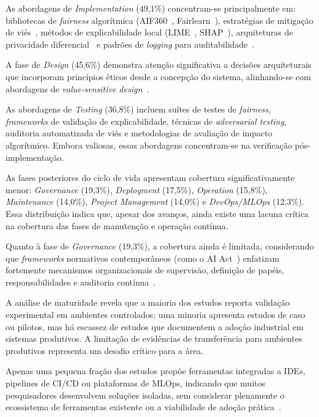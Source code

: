 As abordagens de \textit{Implementation} (49,1\%) concentram-se principalmente em: bibliotecas de \textit{fairness} algorítmica (AIF360~\cite{Bellamy2019}, Fairlearn~\cite{Bird2020}), estratégias de mitigação de viés~\cite{Kamiran2013, Zemel2013}, métodos de explicabilidade local (LIME~\cite{Ribeiro2016}, SHAP~\cite{Lundberg2017}), arquiteturas de privacidade diferencial~\cite{Abadi2016, McMahan2018} e padrões de \textit{logging} para auditabilidade~\cite{Mitchell2019, Arnold2019}. 

A fase de \textit{Design} (45,6\%) demonstra atenção significativa a decisões arquiteturais que incorporam princípios éticos desde a concepção do sistema, alinhando-se com abordagens de \textit{value-sensitive design}~\cite{Friedman2013, VanWynsberghe2013}.

As abordagens de \textit{Testing} (36,8\%) incluem suítes de testes de \textit{fairness}, \textit{frameworks} de validação de explicabilidade, técnicas de \textit{adversarial testing}, auditoria automatizada de viés e metodologias de avaliação de impacto algorítmico. Embora valiosas, essas abordagens concentram-se na verificação pós-implementação.

As fases posteriores do ciclo de vida apresentam cobertura significativamente menor: \textit{Governance} (19,3\%), \textit{Deployment} (17,5\%), \textit{Operation} (15,8\%), \textit{Maintenance} (14,0\%), \textit{Project Management} (14,0\%) e \textit{DevOps/MLOps} (12,3\%). Essa distribuição indica que, apesar dos avanços, ainda existe uma lacuna crítica na cobertura das fases de manutenção e operação contínua.

Quanto à fase de \textit{Governance} (19,3\%), a cobertura ainda é limitada, considerando que \textit{frameworks} normativos contemporâneos (como o AI Act~\cite{EUAIAct2024}) enfatizam fortemente mecanismos organizacionais de supervisão, definição de papéis, responsabilidades e auditoria contínua~\cite{Raji2020, Metcalf2021}.

A análise de maturidade revela que a maioria dos estudos reporta validação experimental em ambientes controlados; uma minoria apresenta estudos de caso ou pilotos, mas há escassez de estudos que documentem a adoção industrial em sistemas produtivos. A limitação de evidências de transferência para ambientes produtivos representa um desafio crítico para a área.

Apenas uma pequena fração dos estudos propõe ferramentas integradas a IDEs, pipelines de CI/CD ou plataformas de MLOps, indicando que muitos pesquisadores desenvolvem soluções isoladas, sem considerar plenamente o ecossistema de ferramentas existente ou a viabilidade de adoção prática~\cite{Hohman2020, Amershi2019}.

